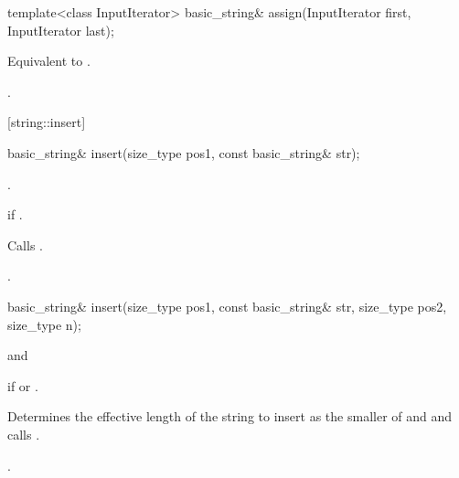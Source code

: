 %
%
\begin{itemdecl}
template<class InputIterator>
  basic_string& assign(InputIterator first, InputIterator last);
\end{itemdecl}

\begin{itemdescr}
\pnum
\effects Equivalent to .

\pnum
\returns
{}.
\end{itemdescr}

[string::insert]{}

%
%
\begin{itemdecl}
basic_string&
  insert(size_type pos1,
         const basic_string& str);
\end{itemdecl}

\begin{itemdescr}
\pnum
\requires {}.

\pnum
\throws {} if .

\pnum
\effects Calls .

\pnum
\returns
{}.
\end{itemdescr}

%
%
\begin{itemdecl}
basic_string&
  insert(size_type pos1,
         const basic_string& str,
         size_type pos2, size_type n);
\end{itemdecl}

\begin{itemdescr}
\pnum
\requires
{}
and

\pnum
\throws
{}
if
or
.

\pnum
\effects
Determines the effective length  of the string to insert as the smaller
of  and
 and calls .

\pnum
\returns
{}.
\end{itemdescr}

